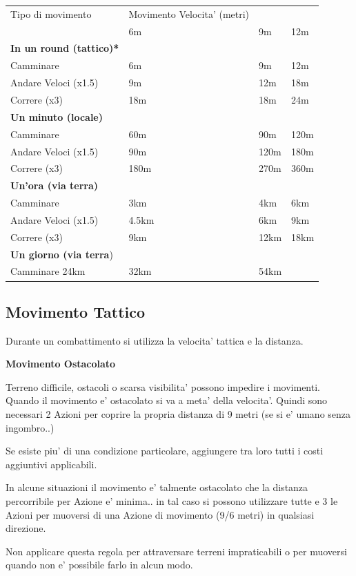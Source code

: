 \documentclass[a4paper,11pt,twoside,openany]{dndbook}
\begin{document}
{\begin{tabular}[l]{@{}llll@{}}
	\toprule 
	Tipo di movimento & Movimento Velocita' (metri) \tabularnewline
&6m &9m &12m
\\
\textbf{In un round (tattico)*} \\
Camminare &6m &9m &12m
\\
Andare Veloci (x1.5) &9m& 12m& 18m
\\
Correre (x3)&18m &18m &24m
\\
\textbf{Un minuto (locale)}\\
Camminare & 60m &90m &120m
\\
Andare Veloci (x1.5) &90m &120m &180m
\\
Correre (x3)& 180m &270m &360m
\\
\textbf{Un’ora (via terra)}
\\
Camminare & 3km &4km& 6km
\\
Andare Veloci (x1.5) &4.5km &6km& 9km\\
Correre (x3) &9km &12km &18km
\\
\textbf{Un giorno (via terra})\\
Camminare 24km &32km &54km
\\
\bottomrule
\end{tabular}
\bigskip


\subsection{Movimento Tattico}

Durante un combattimento si utilizza la velocita' tattica e la distanza.

\textbf{Movimento Ostacolato}

Terreno difficile, ostacoli o scarsa visibilita' possono impedire i movimenti. Quando il movimento e' ostacolato si va a meta' della velocita'. Quindi sono necessari 2 Azioni per coprire la propria distanza di 9 metri (se si e' umano senza ingombro..) 

Se esiste piu' di una condizione particolare, aggiungere tra loro tutti i costi aggiuntivi applicabili.

In alcune situazioni il movimento e' talmente ostacolato che la distanza percorribile per Azione e' minima.. in tal caso si possono utilizzare tutte e 3 le Azioni per muoversi di una Azione di movimento (9/6 metri) in qualsiasi direzione.

Non applicare questa regola per attraversare terreni impraticabili o per muoversi quando non e' possibile farlo in alcun modo. 

}
\end{document}

